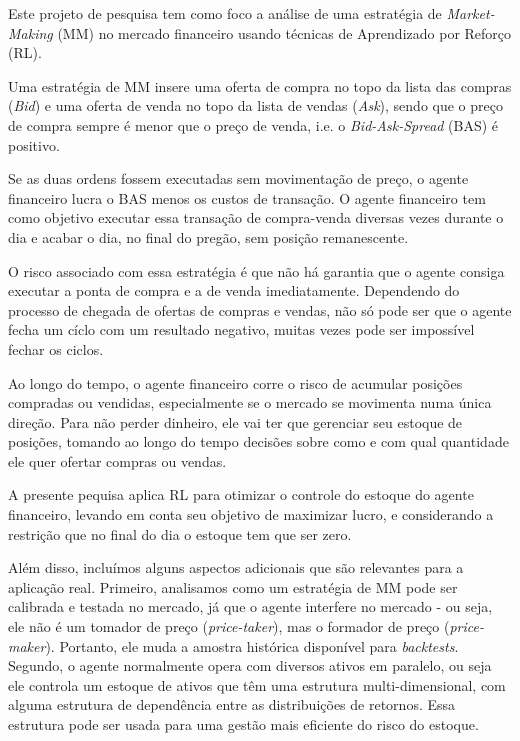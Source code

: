 Este projeto de pesquisa tem como foco a análise de uma estratégia de \textit{Market-Making} (MM) no mercado financeiro usando técnicas de Aprendizado por Reforço (RL). 

Uma estratégia de MM insere uma oferta de compra no topo da lista das compras (\textit{Bid}) e uma oferta de venda no topo da lista de vendas (\textit{Ask}), sendo que o preço de compra sempre é menor que o preço de venda, i.e. o \textit{Bid-Ask-Spread} (BAS) é positivo.

Se as duas ordens fossem executadas sem movimentação de preço, o agente financeiro lucra o BAS menos os custos de transação. 
O agente financeiro tem como objetivo executar essa transação de compra-venda diversas vezes durante o dia e acabar o dia, no final do pregão, sem posição remanescente.

O risco associado com essa estratégia é que não há garantia que o agente consiga executar a ponta de compra e a de venda imediatamente.
Dependendo do processo de chegada de ofertas de compras e vendas, não só pode ser que o agente fecha um cíclo com um resultado negativo, muitas vezes pode ser impossível fechar os ciclos.

Ao longo do tempo, o agente financeiro corre o risco de acumular posições compradas ou vendidas, especialmente se o mercado se movimenta numa única direção. Para não perder dinheiro, ele vai ter que gerenciar seu estoque de posições, tomando ao longo do tempo decisões sobre como e com qual quantidade ele quer ofertar compras ou vendas.

A presente pequisa aplica RL para otimizar o controle do estoque do agente financeiro, levando em conta seu objetivo de maximizar lucro, e considerando a restrição que no final do dia o estoque tem que ser zero. 

Além disso, incluímos alguns aspectos adicionais que são relevantes para a aplicação real.
Primeiro, analisamos como um estratégia de MM pode ser calibrada e testada no mercado, já que o agente interfere no mercado - ou seja, ele não é um tomador de preço (\textit{price-taker}), mas o formador de preço (\textit{price-maker}). Portanto, ele muda a amostra histórica disponível para \textit{backtests}.
Segundo, o agente normalmente opera com diversos ativos em paralelo, ou seja ele controla um estoque de ativos que têm uma estrutura multi-dimensional, com alguma estrutura de dependência entre as distribuições de retornos. Essa estrutura pode ser usada para uma gestão mais eficiente do risco do estoque.

